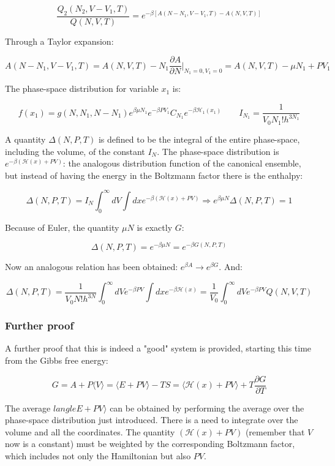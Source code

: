 	$$\frac{Q_2(N_2, V-V_1, T)}{Q(N, V, T)} = e^{-\beta[A(N-N_1, V-V_1, T) - A(N, V, T)]}$$

	Through a Taylor expansion:

	$$A(N-N_1, V-V_1, T) = A(N, V, T)-N_1\frac{\partial A}{\partial N}|_{N_1 = 0, V_1 = 0} = A(N, V, T)-\mu N_1 + PV_1$$

	The phase-space distribution for variable $x_1$ is:

	$$f(x_1) = g(N, N_1, N-N_1) e^{\beta\mu N_1}e^{-\beta P V_1}C_{N_1}e^{-\beta\mathcal{H}_1(x_1)}\qquad I_{N_1} = \frac{1}{V_0N_1!h^{3N_1}}$$

	A quantity $\Delta(N, P, T)$ is defined to be the integral of the entire phase-space, including the volume, of the constant $I_N$.
	The phase-space distribution is $e^{-\beta(\mathcal{H}(x) + PV)}$: the analogous distribution function of the canonical ensemble, but instead of having the energy in the Boltzmann factor there is the enthalpy:

	$$\Delta(N, P, T) = I_N\int_0^{\infty}dV\int dxe^{-\beta(\mathcal{H}(x) + PV)}\Rightarrow e^{\beta\mu N}\Delta(N, P, T) = 1$$

	Because of Euler, the quantity $\mu N$ is exactly $G$:

	$$\Delta(N, P, T) = e^{-\beta\mu N} = e^{-\beta G(N, P, T)}$$

	Now an analogous relation has been obtained: $e^{\beta A} \rightarrow e^{\beta G}$.
	And:

	$$\Delta(N, P, T) = \frac{1}{V_0N!h^{3N}}\int_0^{\infty}dVe^{-\beta PV}\int dxe^{-\beta\mathcal{H}(x)} = \frac{1}{V_0}\int_0^{\infty}dVe^{-\beta PV}Q(N, V, T)$$

	\subsubsection{Further proof}
	A further proof that this is indeed a "good" system is provided, starting this time from the Gibbs free energy:

	$$G = A + P\langle V \rangle = \langle E + PV\rangle - TS = \langle\mathcal{H}(x) + PV\rangle + T\frac{\partial G}{\partial T}$$

	The average $langle E + PV\rangle$ can be obtained by performing the average over the phase-space distribution just introduced.
	There is a need to integrate over the volume and all the coordinates.
	The quantity $(\mathcal{H}(x) + PV)$ (remember that $V$ now is a constant) must be weighted by the corresponding Boltzmann factor, which includes not only the Hamiltonian but also $PV$.

